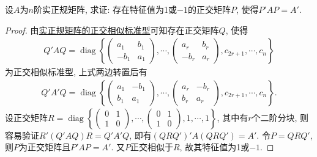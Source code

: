 \documentclass[../../main.tex]{subfiles}%
\begin{document}
\begin{example}
设\( A \)为\( n \)阶实正规矩阵, 求证: 存在特征值为1或\(-1\)的正交矩阵\( P \), 使得\( P'AP = A' \).
\end{example}
\begin{proof}

由\hyperref[theorem:实正规矩阵的正交相似标准型]{实正规矩阵的正交相似标准型}可知存在正交矩阵$Q$, 使得
\begin{align*}
Q'AQ = \operatorname{diag}\left\{ \begin{pmatrix} a_1 & b_1 \\ -b_1 & a_1 \end{pmatrix}, \cdots, \begin{pmatrix} a_r & b_r \\ -b_r & a_r \end{pmatrix}, c_{2r+1}, \cdots, c_n \right\}
\end{align*}
为正交相似标准型, 上式两边转置后有
\begin{align*}
Q'A'Q = \operatorname{diag}\left\{ \begin{pmatrix} a_1 & -b_1 \\ b_1 & a_1 \end{pmatrix}, \cdots, \begin{pmatrix} a_r & -b_r \\ b_r & a_r \end{pmatrix}, c_{2r+1}, \cdots, c_n \right\}.
\end{align*}
设正交矩阵\( R = \operatorname{diag}\left\{ \begin{pmatrix} 0 & 1 \\ 1 & 0 \end{pmatrix}, \cdots, \begin{pmatrix} 0 & 1 \\ 1 & 0 \end{pmatrix}, 1, \cdots, 1 \right\} \), 其中有\( r \)个二阶分块, 则容易验证\( R'(Q'AQ)R = Q'A'Q \), 即有\( (QRQ')'A(QRQ') = A' \). 令\( P = QRQ' \), 则\( P \)为正交矩阵且\( P'AP = A' \). 又\( P \)正交相似于\( R \), 故其特征值为1或\(-1\). 

\end{proof}
\end{document}
